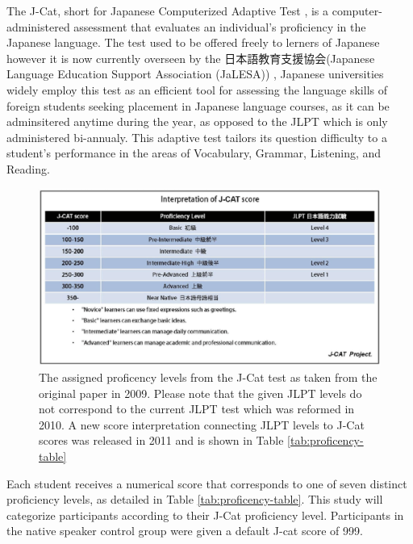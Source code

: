 
The J-Cat, short for Japanese Computerized Adaptive Test \cite{Imai2009}, is a computer-administered assessment that
evaluates an
individual's proficiency in the Japanese language. The test used to be offered freely to lerners of Japanese however
it is now currently overseen by the 日本語教育支援協会(Japanese Language Education Support Association (JaLESA)) , Japanese
universities widely
employ this test as an efficient tool for assessing the language skills of foreign students seeking placement in
Japanese language courses, as it can be adminsitered anytime during the year, as opposed to the JLPT which is only
administered bi-annualy. This adaptive test tailors its
question difficulty to a
student's performance in
the areas of Vocabulary, Grammar, Listening, and Reading.

\begin{figure}[h]
    \centering
    \includegraphics[scale=.3]{img/JCatScores.png}
    \caption[J-Cat Proficency Levels]{The assigned proficency levels from the J-Cat test as taken from the original paper in  2009. Please note that the given JLPT levels do not correspond to the current JLPT test which was reformed in 2010. A new score interpretation connecting JLPT levels to J-Cat scores was released in 2011 and is shown in Table \ref{tab:proficency-table} }
    \label{fig:JCatLevels}
\end{figure}

Each student receives a numerical score that corresponds to one of seven distinct proficiency levels, as detailed in
Table \ref{tab:proficency-table}. This study will categorize participants according to their J-Cat proficiency level. Participants in the
native speaker control group were given a default J-cat score of 999.

